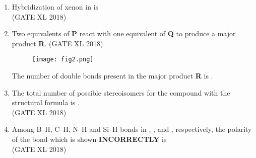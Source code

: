 \documentclass[14pt]{extarticle}
\begin{document}
\begin{flushleft}
\begin{enumerate}
\item Hybridization of xenon in  is\\
\hfill (GATE XL 2018)\\
\begin{enumerate}
\end{enumerate}

\item Two equivalents of \textbf{P} react with one equivalent of \textbf{Q} to produce a major product \textbf{R}. \hfill (GATE XL 2018)\\
\begin{figure}[H]
\centering
\texttt{[image: fig2.png]}
\label{fig:q4}
\caption{}
\end{figure}
The number of double bonds present in the major product \textbf{R} is \underline{\hspace{3cm}}.

\item The total number of possible stereoisomers for the compound with the structural formula  is \underline{\hspace{3cm}}.\\
    \hfill (GATE XL 2018)\\

    \item Among B–H, C–H, N–H and Si–H bonds in , ,  and , respectively, the polarity of the bond which is shown \textbf{INCORRECTLY} is\\
    \hfill (GATE XL 2018)\\
    \begin{enumerate}
    \end{enumerate}


\end{enumerate}
\end{flushleft}
\end{document}
